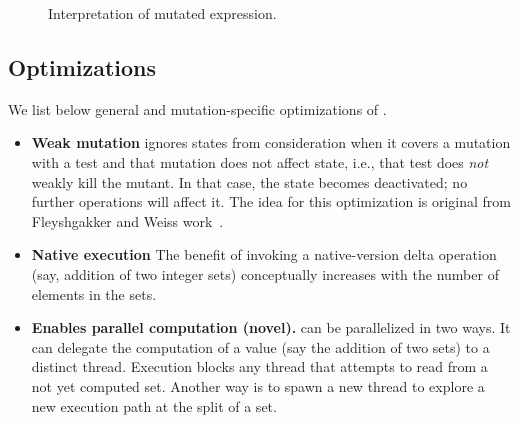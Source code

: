 \documentclass{sig-alternate}
\begin{document}
\subfiguretopcaptrue
\begin{figure}[t]
  \centering
  \begin{small}
    \caption{\label{fig:delta-schemata}Interpretation of mutated expression.}  
  \end{small}
\end{figure}

\subsection{Optimizations}

We list below general and mutation-specific optimizations of \DE{}.

\begin{itemize}

\item \textbf{Weak mutation} \DE{} ignores states from consideration
  when it covers a mutation with a test and that mutation does not
  affect state, i.e., that test does \emph{not} weakly kill the
  mutant.  In that case, the state becomes deactivated; no further
  operations will affect it.  The idea for this optimization is
  original from Fleyshgakker and Weiss
  work~\cite{FleyshgakkerWeiss-issta1994}.

\item \textbf{Native execution} The benefit of invoking a
  native-version delta operation (say, addition of two integer sets)
  conceptually increases with the number of elements in the sets.

\item \textbf{Enables parallel computation (novel).}  \DE{} can be
  parallelized in two ways.  It can delegate the computation of a
  value (say the addition of two sets) to a distinct thread.
  Execution blocks any thread that attempts to read from a not yet
  computed set.  Another way is to spawn a new thread to explore a new
  execution path at the split of a set.

\end{itemize}
\end{document}
